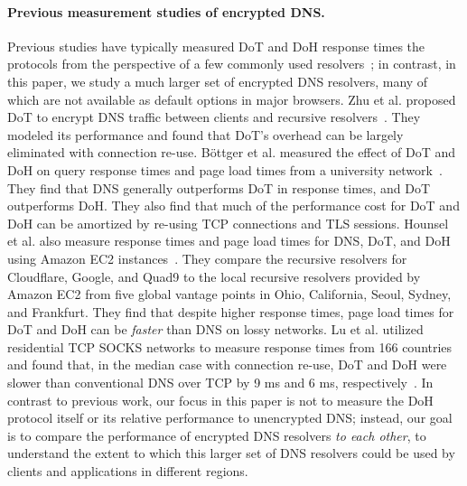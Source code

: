 \paragraph{Previous measurement studies of encrypted DNS.}
Previous studies have typically measured DoT and DoH response times the
protocols from the perspective of a few commonly used
resolvers~\cite{lu2019end-to-end}; in contrast, in this paper, we study a much
larger set of encrypted DNS resolvers, many of which are not available as
default options in major browsers.  Zhu et al. proposed DoT to encrypt DNS
traffic between clients and recursive resolvers~\cite{zhu2015connection}.
They modeled its performance and found that DoT's overhead can be largely
eliminated with connection re-use.  Böttger et al. measured the effect of DoT
and DoH on query response times and page load times from a university
network~\cite{boettger2019empirical}.  They find that DNS generally
outperforms DoT in response times, and DoT outperforms DoH.  They also find
that much of the performance cost for DoT and DoH can be amortized by re-using
TCP connections and TLS sessions.  Hounsel et al. also measure response times
and page load times for DNS, DoT, and DoH using Amazon EC2
instances~\cite{hounsel2020comparing}.  They compare the recursive resolvers
for Cloudflare, Google, and Quad9 to the local recursive resolvers provided by
Amazon EC2 from five global vantage points in Ohio, California, Seoul, Sydney,
and Frankfurt.  They find that despite higher response times, page load times
for DoT and DoH can be \emph{faster} than DNS on lossy networks.  Lu et al.
utilized residential TCP SOCKS networks to measure response times from 166
countries and found that, in the median case with connection re-use, DoT and
DoH were slower than conventional DNS over TCP by 9 ms and 6 ms,
respectively~\cite{lu2019end-to-end}.
In contrast to previous work, our focus in this paper is not to measure the
DoH protocol itself or its relative performance to unencrypted DNS; instead,
our goal is to compare the performance of encrypted DNS resolvers {\em to
each other}, to understand the extent to which this larger set of DNS
resolvers could be used by clients and applications in different regions.


